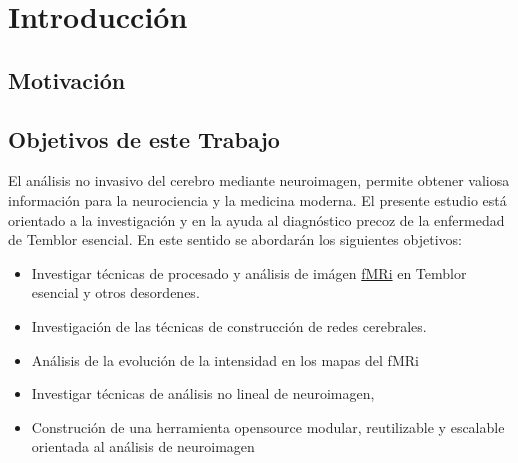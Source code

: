 \chapter{Introducción}

\section{Motivación}


\section{Objetivos de este Trabajo}

El análisis no invasivo del cerebro mediante neuroimagen, permite obtener valiosa información para la neurociencia y la medicina moderna. El presente estudio está orientado a la investigación y en la ayuda al diagnóstico precoz de la enfermedad de Temblor esencial. En este sentido se abordarán los siguientes objetivos:

\begin{itemize}
\item Investigar técnicas de procesado y análisis de imágen \hyperref[glos:fmri]{fMRi} en Temblor esencial y otros desordenes.
\item Investigación de las técnicas de construcción de redes cerebrales.
\item Análisis de la evolución de la intensidad en los mapas del fMRi
\item Investigar técnicas de análisis no lineal de neuroimagen,
\item Construción de una herramienta opensource modular, reutilizable y escalable orientada al análisis de neuroimagen
\end{itemize}


